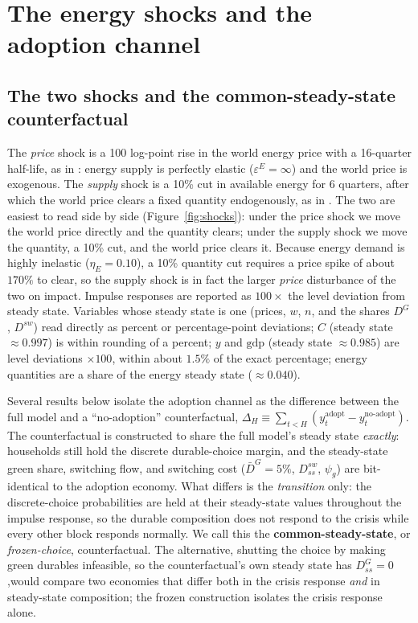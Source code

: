\section{The energy shocks and the adoption channel}
\label{sec:experiments}

\subsection{The two shocks and the common-steady-state counterfactual}
\label{sec:counterfactual}

The \emph{price} shock is a 100 log-point rise in the world energy price with a
16-quarter half-life, as in \citet{ARS2024}: energy supply is perfectly elastic
($\varepsilon^{E}=\infty$) and the world price is exogenous. The \emph{supply}
shock is a 10\% cut in available energy for 6 quarters, after which the world
price clears a fixed quantity endogenously, as in \citet{Bayer2026}. The two are
easiest to read side by side (Figure~\ref{fig:shocks}): under the price shock we
move the world price directly and the quantity clears; under the supply shock we
move the quantity, a 10\% cut, and the world price clears it. Because energy
demand is highly inelastic ($\eta_E=0.10$), a 10\% quantity cut requires a price
spike of about $170\%$ to clear, so the supply shock is in fact the larger
\emph{price} disturbance of the two on impact. Impulse
responses are reported as $100\times$ the level deviation from steady state.
Variables whose steady state is one (prices, $w$, $n$, and the shares $D^{G}$,
$D^{sw}$) read directly as percent or percentage-point deviations; $C$ (steady
state $\approx0.997$) is within rounding of a percent; $y$ and $\mathrm{gdp}$
(steady state $\approx0.985$) are level deviations $\times100$, within about
$1.5\%$ of the exact percentage; energy quantities are a share of the energy
steady state ($\approx0.040$).

Several results below isolate the adoption channel as the difference between the
full model and a ``no-adoption'' counterfactual,
$\Delta_H\equiv\sum_{t<H}(y^{\mathrm{adopt}}_t-y^{\mathrm{no\text{-}adopt}}_t)$.
The counterfactual is constructed to share the full model's steady state
\emph{exactly}: households still hold the discrete durable-choice margin, and the
steady-state green share, switching flow, and switching cost
($\bar D^{G}=5\%$, $D^{sw}_{ss}$, $\psi_g$) are bit-identical to the adoption
economy. What differs is the \emph{transition} only: the discrete-choice
probabilities are held at their steady-state values throughout the impulse
response, so the durable composition does not respond to the crisis while every
other block responds normally. We call this the \textbf{common-steady-state}, or
\emph{frozen-choice}, counterfactual. The alternative, shutting the choice by
making green durables infeasible, so the counterfactual's own steady state has
$D^{G}_{ss}=0$,would compare two economies that differ both in the crisis
response \emph{and} in steady-state composition; the frozen construction isolates
the crisis response alone.

